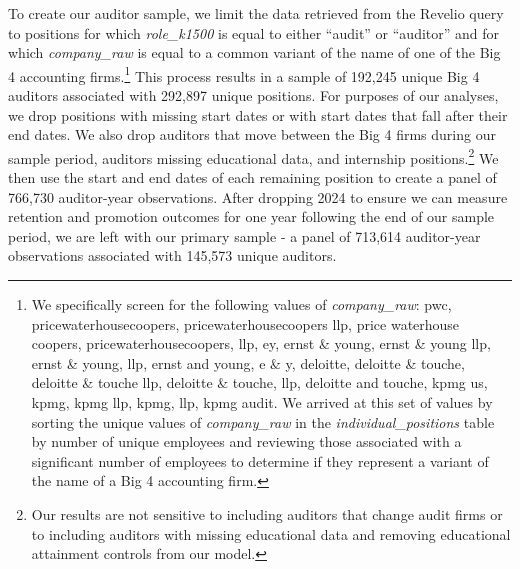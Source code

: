 \documentclass[11pt]{article}
\begin{document}
        To create our auditor sample, we limit the data retrieved from the Revelio query to positions for which \textit{role\_k1500} is equal to either ``audit'' or ``auditor'' and for which \textit{company\_raw} is equal to a common variant of the name of one of the Big 4 accounting firms.\footnote{We specifically screen for the following values of \textit{company\_raw}: pwc, pricewaterhousecoopers, pricewaterhousecoopers llp, price waterhouse coopers, pricewaterhousecoopers, llp, ey, ernst \& young, ernst \& young llp, ernst \& young, llp, ernst and young, e \& y, deloitte, deloitte \& touche, deloitte \& touche llp, deloitte \& touche, llp, deloitte and touche, kpmg us, kpmg, kpmg llp, kpmg, llp, kpmg audit. We arrived at this set of values by sorting the unique values of \textit{company\_raw} in the \textit{individual\_positions} table by number of unique employees and reviewing those associated with a significant number of employees to determine if they represent a variant of the name of a Big 4 accounting firm.\label{footnote:firmNames}} This process results in a sample of 192,245 unique Big 4 auditors associated with 292,897 unique positions. For purposes of our analyses, we drop positions with missing start dates or with start dates that fall after their end dates. We also drop auditors that move between the Big 4 firms during our sample period, auditors missing educational data, and internship positions.\footnote{Our results are not sensitive to including auditors that change audit firms or to including auditors with missing educational data and removing educational attainment controls from our model.} We then use the start and end dates of each remaining position to create a panel of 766,730 auditor-year observations. After dropping 2024 to ensure we can measure retention and promotion outcomes for one year following the end of our sample period, we are left with our primary sample - a panel of 713,614 auditor-year observations associated with 145,573 unique auditors.
        
\end{document}
